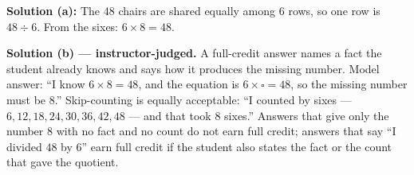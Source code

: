 \documentclass[12pt]{article}
\begin{document}

\textbf{Solution (a):} The $48$ chairs are shared equally among $6$ rows, so one row is $48 \div 6$.
From the sixes: $6 \times 8 = 48$. 

\textbf{Solution (b) --- instructor-judged.} A full-credit answer names a fact the student already
knows and says how it produces the missing number. Model answer: ``I know $6 \times 8 = 48$, and the
equation is $6 \times \square = 48$, so the missing number must be $8$.'' Skip-counting is equally
acceptable: ``I counted by sixes --- $6, 12, 18, 24, 30, 36, 42, 48$ --- and that took $8$ sixes.''
Answers that give only the number $8$ with no fact and no count do not earn full credit; answers that
say ``I divided $48$ by $6$'' earn full credit if the student also states the fact or the count that
gave the quotient.
\end{document}
